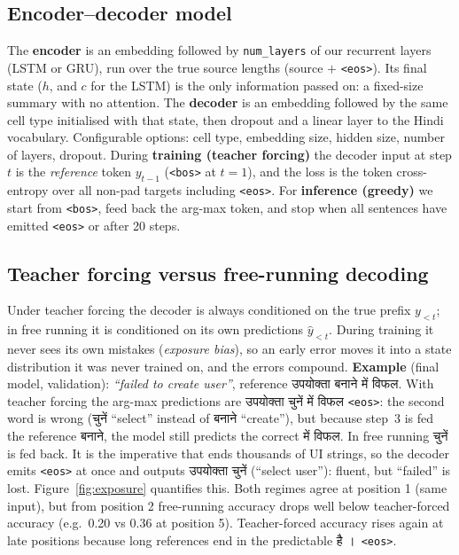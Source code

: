\documentclass[10pt,a4paper]{article}
\newcommand{\hi}[1]{{\hindifont #1}}
\newcommand{\code}[1]{\texttt{#1}}
\begin{document}
\subsection{Encoder--decoder model}
The \textbf{encoder} is an embedding followed by \code{num\_layers} of our recurrent layers (LSTM or GRU),
run over the true source lengths (source $+$ \code{<eos>}). Its final state ($h$, and $c$ for the LSTM) is the
only information passed on: a fixed-size summary with no attention. The \textbf{decoder} is an embedding
followed by the same cell type initialised with that state, then dropout and a linear layer to the Hindi
vocabulary. Configurable options: cell type, embedding size, hidden size, number of layers, dropout. During
\textbf{training (teacher forcing)} the decoder input at step $t$ is the \emph{reference} token $y_{t-1}$
(\code{<bos>} at $t=1$), and the loss is the token cross-entropy over all non-pad targets including
\code{<eos>}. For \textbf{inference (greedy)} we start from \code{<bos>}, feed back the arg-max token, and stop when
all sentences have emitted \code{<eos>} or after 20 steps.

\subsection{Teacher forcing versus free-running decoding}
Under teacher forcing the decoder is always conditioned on the true prefix $y_{<t}$; in free running it is
conditioned on its own predictions $\hat y_{<t}$. During training it never sees its own mistakes
(\emph{exposure bias}), so an early error moves it into a state distribution it was never trained on, and the
errors compound. \textbf{Example} (final model, validation): \emph{``failed to create user''}, reference
\hi{उपयोक्ता बनाने में विफल}. With teacher forcing the arg-max predictions are
\hi{उपयोक्ता चुनें में विफल} \code{<eos>}: the second word is wrong (\hi{चुनें} ``select'' instead of
\hi{बनाने} ``create''), but because step~3 is fed the reference \hi{बनाने}, the model still predicts the
correct \hi{में विफल}. In free running \hi{चुनें} is fed back. It is the imperative that ends thousands of
UI strings, so the decoder emits \code{<eos>} at once and outputs \hi{उपयोक्ता चुनें} (``select user''):
fluent, but ``failed'' is lost. Figure~\ref{fig:exposure} quantifies this. Both regimes agree at position 1
(same input), but from position 2 free-running accuracy drops well below teacher-forced accuracy
(e.g.\ 0.20 vs 0.36 at position 5). Teacher-forced accuracy rises again at late positions because long
references end in the predictable \hi{है ।}~\code{<eos>}.
\end{document}
